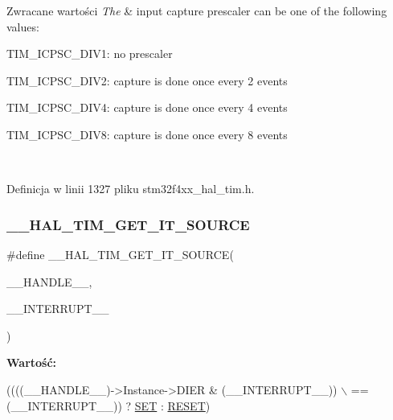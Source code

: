 \begin{DoxyRetVals}{Zwracane wartości}
{\em The} & input capture prescaler can be one of the following values\+: \begin{DoxyItemize}
\item T\+I\+M\+\_\+\+I\+C\+P\+S\+C\+\_\+\+D\+I\+V1\+: no prescaler \item T\+I\+M\+\_\+\+I\+C\+P\+S\+C\+\_\+\+D\+I\+V2\+: capture is done once every 2 events \item T\+I\+M\+\_\+\+I\+C\+P\+S\+C\+\_\+\+D\+I\+V4\+: capture is done once every 4 events \item T\+I\+M\+\_\+\+I\+C\+P\+S\+C\+\_\+\+D\+I\+V8\+: capture is done once every 8 events \end{DoxyItemize}
\\
\hline
\end{DoxyRetVals}


Definicja w linii 1327 pliku stm32f4xx\+\_\+hal\+\_\+tim.\+h.

\mbox{\label{group___t_i_m___exported___macros_ga644babf93470a6eee6bce8906c4da5c5}} 
\subsubsection{\texorpdfstring{\+\_\+\+\_\+\+H\+A\+L\+\_\+\+T\+I\+M\+\_\+\+G\+E\+T\+\_\+\+I\+T\+\_\+\+S\+O\+U\+R\+CE}{\_\_HAL\_TIM\_GET\_IT\_SOURCE}}
{\footnotesize\ttfamily \#define \+\_\+\+\_\+\+H\+A\+L\+\_\+\+T\+I\+M\+\_\+\+G\+E\+T\+\_\+\+I\+T\+\_\+\+S\+O\+U\+R\+CE(\begin{DoxyParamCaption}\item[{}]{\+\_\+\+\_\+\+H\+A\+N\+D\+L\+E\+\_\+\+\_\+,  }\item[{}]{\+\_\+\+\_\+\+I\+N\+T\+E\+R\+R\+U\+P\+T\+\_\+\+\_\+ }\end{DoxyParamCaption})}

{\bfseries Wartość\+:}
\begin{DoxyCode}
((((\_\_HANDLE\_\_)->Instance->DIER & (\_\_INTERRUPT\_\_)) \(\backslash\)
                                                             == (\_\_INTERRUPT\_\_)) ? 
      \hyperlink{group___exported__types_gga89136caac2e14c55151f527ac02daaffab44c8101cc294c074709ec1b14211792}{SET} : \hyperlink{group___exported__types_gga89136caac2e14c55151f527ac02daaffa589b7d94a3d91d145720e2fed0eb3a05}{RESET})
\end{DoxyCode}


